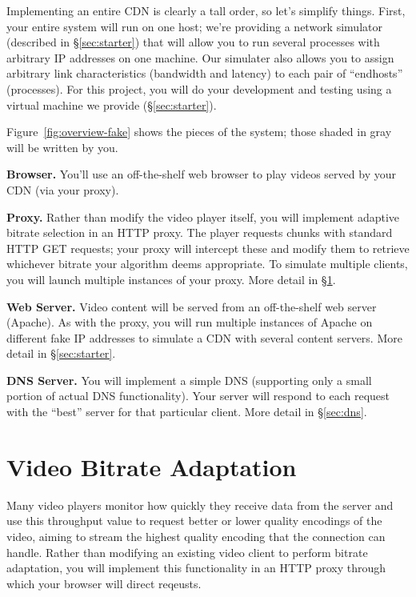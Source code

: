 \documentclass{article}
\begin{document}
Implementing an entire CDN is clearly a tall order, so let's simplify things.
First, your entire system will run on one host; we're providing a network
simulator (described in \S\ref{sec:starter}) that will allow you to run several
processes with arbitrary IP addresses on one machine. Our simulater also allows
you to assign arbitrary link characteristics (bandwidth and latency) to each
pair of ``endhosts'' (processes). For this project, you will do your
development and testing using a virtual machine we provide
(\S\ref{sec:starter}).

Figure~\ref{fig:overview-fake} shows the pieces of the system; those shaded in
gray will be written by you.

\medskip\noindent \textbf{Browser.} You'll use an off-the-shelf web browser to play
videos served by your CDN (via your proxy).

\medskip \noindent \textbf{Proxy.} Rather than modify the video player itself,
you will implement adaptive bitrate selection in an HTTP proxy. The player
requests chunks with standard HTTP GET requests; your proxy will intercept
these and modify them to retrieve whichever bitrate your algorithm deems
appropriate. To simulate multiple clients, you will launch multiple instances
of your proxy.  More detail in \S\ref{sec:proxy}.

\medskip \noindent \textbf{Web Server.} Video content will be served from an
off-the-shelf web server (Apache). As with the proxy, you will run multiple
instances of Apache on different fake IP addresses to simulate a CDN with
several content servers. More detail in \S\ref{sec:starter}.

\medskip \noindent \textbf{DNS Server.} You will implement a simple DNS (supporting only
a small portion of actual DNS functionality). Your server will respond to each
request with the ``best'' server for that particular client. More detail in
\S\ref{sec:dns}.




\section{Video Bitrate Adaptation}
\label{sec:proxy}

Many video players monitor how quickly they receive data from the server and
use this throughput value to request better or lower quality encodings of the
video, aiming to stream the highest quality encoding that the connection can
handle. Rather than modifying an existing video client to perform bitrate
adaptation, you will implement this functionality in an HTTP proxy through
which your browser will direct reqeusts.
\end{document}
